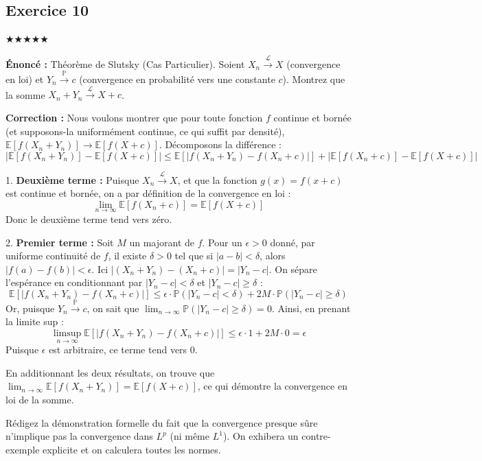 \documentclass[11pt,a4paper]{article}
\begin{document}
\subsection*{Exercice 10}

\quad $\bigstar\bigstar\bigstar\bigstar\bigstar$

\textbf{Énoncé :}
Théorème de Slutsky (Cas Particulier).
Soient $X_n \xrightarrow{\mathcal{L}} X$ (convergence en loi) et $Y_n \xrightarrow{\mathbb{P}} c$ (convergence en probabilité vers une constante $c$).
Montrez que la somme $X_n + Y_n \xrightarrow{\mathcal{L}} X + c$.

\textbf{Correction :}
Nous voulons montrer que pour toute fonction $f$ continue et bornée (et supposons-la uniformément continue, ce qui suffit par densité), $\mathbb{E}[f(X_n + Y_n)] \to \mathbb{E}[f(X + c)]$.
Décomposons la différence :
$$ |\mathbb{E}[f(X_n + Y_n)] - \mathbb{E}[f(X + c)]| \le \mathbb{E}[|f(X_n + Y_n) - f(X_n + c)|] + |\mathbb{E}[f(X_n + c)] - \mathbb{E}[f(X + c)]| $$

1. \textbf{Deuxième terme :} Puisque $X_n \xrightarrow{\mathcal{L}} X$, et que la fonction $g(x) = f(x + c)$ est continue et bornée, on a par définition de la convergence en loi :
$$ \lim_{n \to \infty} \mathbb{E}[f(X_n + c)] = \mathbb{E}[f(X + c)] $$
Donc le deuxième terme tend vers zéro.

2. \textbf{Premier terme :} Soit $M$ un majorant de $f$. Pour un $\epsilon > 0$ donné, par uniforme continuité de $f$, il existe $\delta > 0$ tel que si $|a - b| < \delta$, alors $|f(a) - f(b)| < \epsilon$.
Ici $| (X_n + Y_n) - (X_n + c) | = |Y_n - c|$.
On sépare l'espérance en conditionnant par $|Y_n - c| < \delta$ et $|Y_n - c| \ge \delta$ :
$$ \mathbb{E}[|f(X_n + Y_n) - f(X_n + c)|] \le \epsilon \cdot \mathbb{P}(|Y_n - c| < \delta) + 2M \cdot \mathbb{P}(|Y_n - c| \ge \delta) $$
Or, puisque $Y_n \xrightarrow{\mathbb{P}} c$, on sait que $\lim_{n \to \infty} \mathbb{P}(|Y_n - c| \ge \delta) = 0$.
Ainsi, en prenant la limite sup :
$$ \limsup_{n \to \infty} \mathbb{E}[|f(X_n + Y_n) - f(X_n + c)|] \le \epsilon \cdot 1 + 2M \cdot 0 = \epsilon $$
Puisque $\epsilon$ est arbitraire, ce terme tend vers $0$.

En additionnant les deux résultats, on trouve que $\lim_{n \to \infty} \mathbb{E}[f(X_n + Y_n)] = \mathbb{E}[f(X + c)]$, ce qui démontre la convergence en loi de la somme.

Rédigez la démonstration formelle du fait que la convergence presque sûre n'implique pas la convergence dans $L^p$ (ni même $L^1$). On exhibera un contre-exemple explicite et on calculera toutes les normes.
\end{document}
